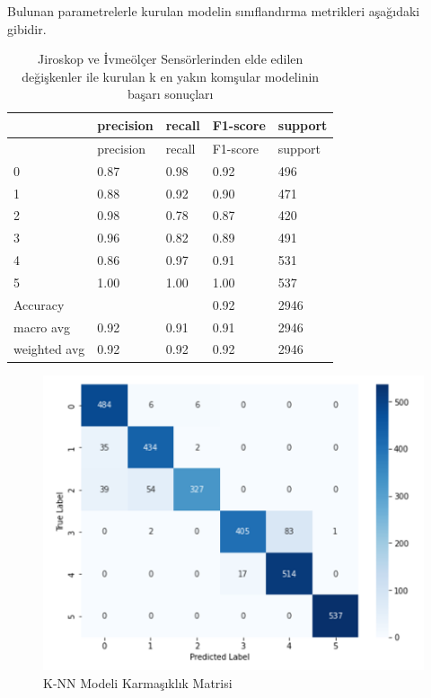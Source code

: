 \documentclass[12pt,twoside]{deuthesis}
\begin{document}
Bulunan parametrelerle kurulan modelin sınıflandırma metrikleri aşağıdaki gibidir.
\begin{longtable}[]{@{}lllll@{}}
\caption{\label{tab:jiknn} Jiroskop ve İvmeölçer Sensörlerinden elde edilen değişkenler ile kurulan k en yakın komşular modelinin başarı sonuçları}\tabularnewline
\toprule()
& precision & recall & F1-score & support \\
\midrule()
\endfirsthead
\toprule()
& precision & recall & F1-score & support \\
\midrule()
\endhead
0 & 0.87 & 0.98 & 0.92 & 496 \\
1 & 0.88 & 0.92 & 0.90 & 471 \\
2 & 0.98 & 0.78 & 0.87 & 420 \\
3 & 0.96 & 0.82 & 0.89 & 491 \\
4 & 0.86 & 0.97 & 0.91 & 531 \\
5 & 1.00 & 1.00 & 1.00 & 537 \\
Accuracy & & & 0.92 & 2946 \\
macro avg & 0.92 & 0.91 & 0.91 & 2946 \\
weighted avg & 0.92 & 0.92 & 0.92 & 2946 \\
\bottomrule()
\end{longtable}
\begin{figure}

{\centering \includegraphics[width=0.9\linewidth,height=0.35\textheight]{figure/jiknn_confmat} 

}

\caption{K-NN Modeli Karmaşıklık Matrisi}\label{fig:jiknnconfmat}
\end{figure}
\end{document}
